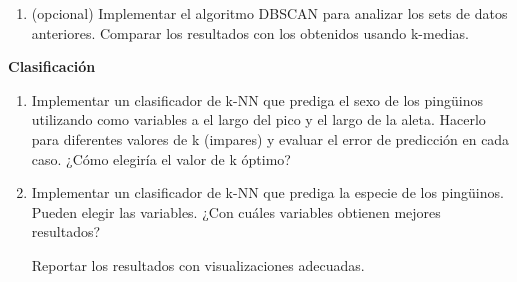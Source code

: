 \documentclass[a4paper,11pt]{article}
\theoremstyle{definition}
\begin{document}
\begin{enumerate}
\begin{enumerate}
	$$
	X_{ij} = \frac{X_{ij} - min(X_{\cdot j}) }{max(X_{\cdot j}) - min(X_{\cdot j})}.
	$$
	
	De esta manera, logramos que los datos de cada columna caigan entre 0 y 1. Normalice los datos siguiendo este criterio.
	
	\textit{(Mirar en Python el comando \texttt{MinMaxScaler})}
	\item Vuelva a correr el procedimiento de clustering, tome las etiquetas de clustering obtenidos y grafique los datos originales con un color que dependa del clustering obtenido con los datos escalados.
	
\end{enumerate}


\item (opcional) Implementar el algoritmo DBSCAN para analizar los sets de datos anteriores. Comparar los resultados con los obtenidos usando k-medias.



\end{enumerate}

\textbf{Clasificación}

\begin{enumerate}[resume]
\item
Implementar un clasificador de k-NN que prediga el sexo de los ping\"uinos utilizando como variables a el largo del pico y el largo de la aleta. Hacerlo para diferentes valores de k (impares) y evaluar el error de predicción en cada caso. ¿Cómo elegiría el valor de k óptimo?

\item
Implementar un clasificador de k-NN que prediga la especie de los ping\"uinos. Pueden elegir las variables. ¿Con cuáles variables obtienen mejores resultados?

Reportar los resultados con visualizaciones adecuadas.
\end{enumerate}
\end{document}
